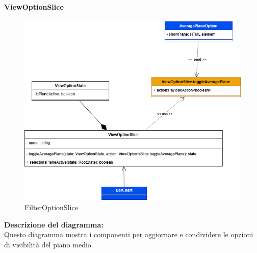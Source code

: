 \paragraph{ViewOptionSlice}
\begin{figure}[h!] \centering
    \includegraphics[scale=0.35]{template/images/uml_front/logic/viewoptionslice.png}
    \caption{FilterOptionSlice}
\end{figure}
\textbf{Descrizione del diagramma:}\\
Questo diagramma mostra i componenti per aggiornare e condividere le opzioni di visibilità del piano medio.
